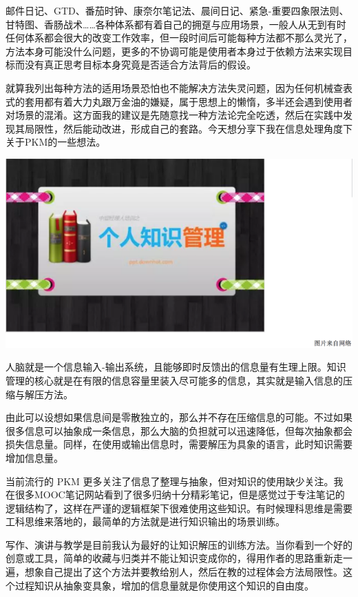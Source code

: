 \documentclass[
]{book}
\begin{document}
邮件日记、GTD、番茄时钟、康奈尔笔记法、晨间日记、紧急-重要四象限法则、甘特图、香肠战术\ldots\ldots 各种体系都有着自己的拥趸与应用场景，一般人从无到有时任何体系都会很大的改变工作效率，但一段时间后可能每种方法都不那么灵光了，方法本身可能没什么问题，更多的不协调可能是使用者本身过于依赖方法来实现目标而没有真正思考目标本身究竟是否适合方法背后的假设。

就算我列出每种方法的适用场景恐怕也不能解决方法失灵问题，因为任何机械查表式的套用都有着大力丸跟万金油的嫌疑，属于思想上的懒惰，多半还会遇到使用者对场景的混淆。这方面我的建议是先随意找一种方法论完全吃透，然后在实践中发现其局限性，然后能动改进，形成自己的套路。今天想分享下我在信息处理角度下关于PKM的一些想法。

\includegraphics[width=8.33in]{images/gtd2}

人脑就是一个信息输入-输出系统，且能够即时反馈出的信息量有生理上限。知识管理的核心就是在有限的信息容量里装入尽可能多的信息，其实就是输入信息的压缩与解压方法。

由此可以设想如果信息间是零散独立的，那么并不存在压缩信息的可能。不过如果很多信息可以抽象成一条信息，那么大脑的负担就可以迅速降低，但每次抽象都会损失信息量。同样，在使用或输出信息时，需要解压为具象的语言，此时知识需要增加信息量。

当前流行的 PKM 更多关注了信息了整理与抽象，但对知识的使用缺少关注。我在很多MOOC笔记网站看到了很多归纳十分精彩笔记，但是感觉过于专注笔记的逻辑结构了，这样在严谨的逻辑框架下很难使用这些知识。有时候理科思维是需要工科思维来落地的，最简单的方法就是进行知识输出的场景训练。

写作、演讲与教学是目前我认为最好的让知识解压的训练方法。当你看到一个好的创意或工具，简单的收藏与归类并不能让知识变成你的，得用作者的思路重新走一遍，想象自己提出了这个方法并要教给别人，然后在教的过程体会方法局限性。这个过程知识从抽象变具象，增加的信息量就是你使用这个知识的自由度。
\end{document}
